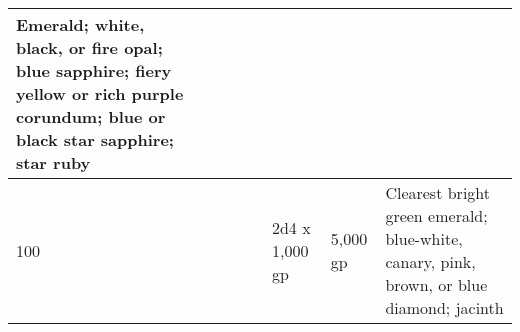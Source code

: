 \begin{longtable}{llllllll}
{\begin{minipage}[t]{0.450in}
Emerald; white, black, or fire opal; blue sapphire; fiery yellow or rich purple 
corundum; blue or black star sapphire; star ruby\end{minipage}}\\
\hline
\multicolumn{5}{p{3.031in}|}{\begin{minipage}[t]{3.031in}\raggedright
100\end{minipage}} & \multicolumn{1}{|p{0.359in}|}{\begin{minipage}[t]{0.359in}\raggedright
2d4 x 1,000 gp\end{minipage}} & \multicolumn{1}{p{0.661in}|}{\begin{minipage}[t]{0.661in}\raggedright
5,000 gp\end{minipage}} & \multicolumn{1}{p{0.450in}|}{\begin{minipage}[t]{0.450in}\raggedright
Clearest bright green emerald; blue-white, canary, pink, brown, or blue diamond; 
jacinth\end{minipage}}\\
\hline
\end{longtable}

